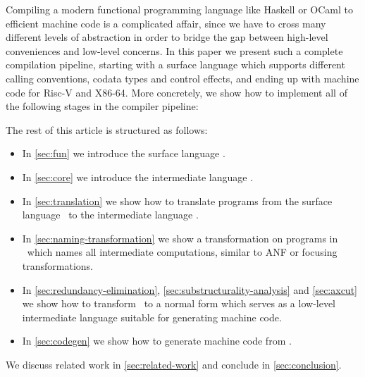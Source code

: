 Compiling a modern functional programming language like Haskell or OCaml to efficient machine code is a complicated affair, since we have to cross many different levels of abstraction in order to bridge the gap between high-level conveniences and low-level concerns.
In this paper we present such a complete compilation pipeline, starting with a surface language which supports different calling conventions, codata types and control effects, and ending up with machine code for Risc-V and X86-64.
More concretely, we show how to implement all of the following stages in the compiler pipeline:
\medskip

\begin{center}
\end{center}

The rest of this article is structured as follows:
\begin{itemize}
    \item In \cref{sec:fun} we introduce the surface language \surfacelang.
    \item In \cref{sec:core} we introduce the intermediate language \targetlang.
    \item In \cref{sec:translation} we show how to translate programs from the surface language \surfacelang\ to the intermediate language \targetlang.
    \item In \cref{sec:naming-transformation} we show a transformation on programs in \targetlang\ which names all intermediate computations, similar to ANF or focusing transformations.
    \item In \cref{sec:redundancy-elimination}, \cref{sec:substructurality-analysis} and \cref{sec:axcut} we show how to transform \targetlang\ to a normal form \machinelang{} which serves as a low-level intermediate language suitable for generating machine code.
    \item In \cref{sec:codegen} we show how to generate machine code from \machinelang.
\end{itemize}
We discuss related work in \cref{sec:related-work} and conclude in \cref{sec:conclusion}.
